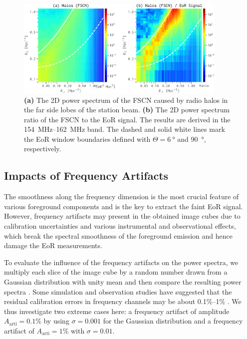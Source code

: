 \documentclass[twocolumn]{aastex62}
\newcommand{\R}[1]{\mathrm{#1}}
\begin{document}
\begin{figure}
  \centering
  \includegraphics[width=0.9\textwidth]{ps2d-fscn}
  \caption{\label{fig:ps2d-fscn}%
    \textbf{(a)} The 2D power spectrum of the FSCN caused by radio halos
    in the far side lobes of the station beam.
    \textbf{(b)} The 2D power spectrum ratio of the FSCN to the EoR signal.
    The results are derived in the \SIrange{154}{162}{\MHz} band.
    The dashed and solid white lines mark the EoR window boundaries
    defined with $\Theta = \SI{6}{\degree}$ and \SI{90}{\degree},
    respectively.
  }
\end{figure}

\subsection{Impacts of Frequency Artifacts}
\label{sec:freq-artifacts}

The smoothness along the frequency dimension is the most crucial feature
of various foreground components and is the key to extract the faint EoR
signal.
However, frequency artifacts may present in the obtained image cubes due
to calibration uncertainties and various instrumental and observational
effects, which break the spectral smoothness of the foreground emission
and hence damage the EoR measurements.

To evaluate the influence of the frequency artifacts on the power
spectra, we multiply each slice of the image cube by a random number
drawn from a Gaussian distribution with unity mean and then compare
the resulting power spectra \citep{chapman2016}.
Some simulation and observation studies have suggested that the residual
calibration errors in frequency channels may be about 0.1\%--1\%
\citep[e.g.,][]{barry2016,beardsley2016,ewallWice2017}.
We thus investigate two extreme cases here:
a frequency artifact of amplitude $A_{\R{arti}} = 0.1\%$ by
using $\sigma = 0.001$ for the Gaussian distribution
and a frequency artifact of $A_{\R{arti}} = 1\%$ with
$\sigma = 0.01$.
\end{document}
